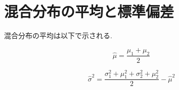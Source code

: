 \documentclass[uplatex, article]{jsbook}
\begin{document}
\section{混合分布の平均と標準偏差}

混合分布の平均は以下で示される.

\[\hat{\mu} = \frac{\mu_1 + \mu_2}{2}\]

\[\hat{\sigma}^2 = \frac{\sigma_1^2 + \mu_1^2 + \sigma_2^2 + \mu_2^2}{2} - \hat{\mu}^2\]
\end{document}
